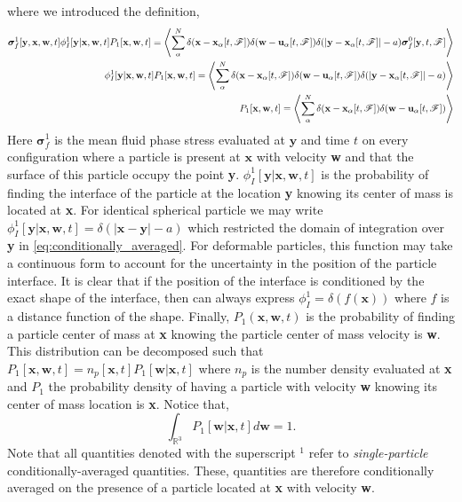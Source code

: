 where we introduced the definition, 
\begin{align}
    \bm\sigma^1_f[\textbf{y},\textbf{x},\textbf{w},t]
    \phi_I^1[\textbf{y}|\textbf{x},\textbf{w},t] 
    P_1[\textbf{x},\textbf{w},t]
    = 
    \left<
    \sum_\alpha^N 
    \delta(\textbf{x} - \textbf{x}_\alpha[t,\mathscr{F}])
    \delta(\textbf{w} - \textbf{u}_\alpha[t,\mathscr{F}])
    \delta(|\textbf{y} - \textbf{x}_{\alpha}[t,\mathscr{F}]|-a)
    \bm\sigma_f^0[\textbf{y},t,\mathscr{F}]
    \right>
    \label{eq:sigma_f_1}
    \\
    \phi_I^1[\textbf{y}|\textbf{x},\textbf{w},t] 
    P_1[\textbf{x},\textbf{w},t]
    = 
    \left<
    \sum_\alpha^N 
    \delta(\textbf{x} - \textbf{x}_\alpha[t,\mathscr{F}])
    \delta(\textbf{w} - \textbf{u}_\alpha[t,\mathscr{F}])
    \delta(|\textbf{y} - \textbf{x}_{\alpha}[t,\mathscr{F}]|-a)
    \right>\\
    P_1[\textbf{x},\textbf{w},t]
    = 
    \left<
    \sum_\alpha^N 
    \delta(\textbf{x} - \textbf{x}_\alpha[t,\mathscr{F}])
    \delta(\textbf{w} - \textbf{u}_\alpha[t,\mathscr{F}])
    \right>
\end{align}
Here $\bm\sigma^1_f$ is the mean fluid phase stress evaluated at $\textbf{y}$ and time $t$ on every configuration where a particle is present at $\textbf{x}$ with velocity \textbf{w} and that the surface of this particle occupy the point \textbf{y}.
$\phi_I^1[\textbf{y}|\textbf{x},\textbf{w},t] $ is the probability of finding the interface of the particle at the location \textbf{y} knowing its center of mass is located at \textbf{x}. 
For identical spherical particle we may write $\phi_I^1[\textbf{y}|\textbf{x},\textbf{w},t] = \delta(|\textbf{x} - \textbf{y}| -a)$ which restricted the domain of integration over \textbf{y} in \ref{eq:conditionally_averaged}. 
For deformable particles, this function may take a continuous form to account for the uncertainty in the position of the particle interface. 
It is clear that if the position of the interface is conditioned by the exact shape of the interface, then can always express $\phi_I^1 = \delta(f(\textbf{x}))$ where $f$ is a distance function of the shape. 
Finally, $P_1(\textbf{x},\textbf{w},t)$ is the probability of finding a particle center of mass at \textbf{x} knowing the particle center of mass velocity is  \textbf{w}.
This distribution can be decomposed such that $P_1[\textbf{x},\textbf{w},t] = n_p[\textbf{x},t] P_1[\textbf{w}|\textbf{x},t]$ where $n_p$ is the number density evaluated at \textbf{x} and $P_1$ the probability density of having a particle with velocity \textbf{w} knowing its center of mass location is \textbf{x}. 
Notice that, 
\begin{equation*}
    \int_{\mathbb{R}^3} P_1[\textbf{w}|\textbf{x},t] d \textbf{w} = 1. 
\end{equation*}
Note that all quantities denoted with the superscript $^1$ refer to \textit{single-particle} conditionally-averaged  quantities.  
These, quantities are therefore conditionally averaged on the presence of a particle located at \textbf{x} with velocity \textbf{w}. 

